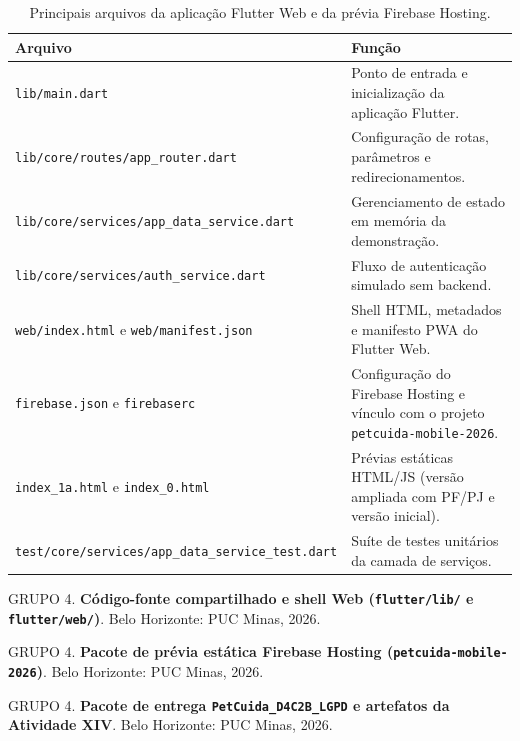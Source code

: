 \documentclass[12pt,a4paper]{article}
\begin{document}
\begin{table}[H]
\centering
\caption{Principais arquivos da aplicação Flutter Web e da prévia Firebase Hosting.}
\label{tab:arquivos_web}
\begin{tabularx}{\textwidth}{>{\raggedright\arraybackslash}p{6.6cm}Y}
\toprule
\textbf{Arquivo} & \textbf{Função}\\
\midrule
\texttt{lib/main.dart} & Ponto de entrada e inicialização da aplicação Flutter.\\
\addlinespace[4pt]
\texttt{lib/core/routes/\allowbreak app\_router.dart} & Configuração de rotas, parâmetros e redirecionamentos.\\
\addlinespace[4pt]
\texttt{lib/core/services/\allowbreak app\_data\_service.dart} & Gerenciamento de estado em memória da demonstração.\\
\addlinespace[4pt]
\texttt{lib/core/services/\allowbreak auth\_service.dart} & Fluxo de autenticação simulado sem backend.\\
\addlinespace[4pt]
\texttt{web/index.html} e \texttt{web/manifest.json} & Shell HTML, metadados e manifesto PWA do Flutter Web.\\
\addlinespace[4pt]
\texttt{firebase.json} e \texttt{firebaserc} & Configuração do Firebase Hosting e vínculo com o projeto \texttt{petcuida-mobile-2026}.\\
\addlinespace[4pt]
\texttt{index\_1a.html} e \texttt{index\_0.html} & Prévias estáticas HTML/JS (versão ampliada com PF/PJ e versão inicial).\\
\addlinespace[4pt]
\texttt{test/core/services/\allowbreak app\_data\_service\_test.dart} & Suíte de testes unitários da camada de serviços.\\
\bottomrule
\end{tabularx}
\end{table}

\begin{thebibliography}{9}
GRUPO 4. \textbf{Código-fonte compartilhado e shell Web (\texttt{flutter/lib/} e \texttt{flutter/web/})}. Belo Horizonte: PUC Minas, 2026.

GRUPO 4. \textbf{Pacote de prévia estática Firebase Hosting (\texttt{petcuida-mobile-2026})}. Belo Horizonte: PUC Minas, 2026.

GRUPO 4. \textbf{Pacote de entrega \texttt{PetCuida\_D4C2B\_LGPD} e artefatos da Atividade XIV}. Belo Horizonte: PUC Minas, 2026.
\end{thebibliography}
\end{document}
